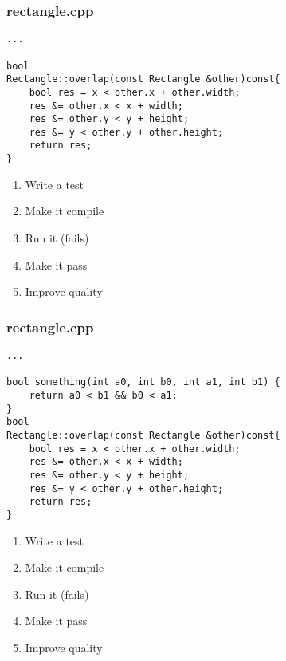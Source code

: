 \begin{frame}[fragile]
\frametitle{rectangle.cpp}
\begin{minipage}[t]{0.48\linewidth}
\begin{lstlisting}
...

bool 
Rectangle::overlap(const Rectangle &other)const{
    bool res = x < other.x + other.width;
    res &= other.x < x + width;
    res &= other.y < y + height;
    res &= y < other.y + other.height;
    return res;
}
\end{lstlisting}
\end{minipage}\hfill
\begin{minipage}[t]{0.28\linewidth}
  \small
  \begin{enumerate} 
    \item \textcolor{deadcolor}{Write a test}
    \item \textcolor{deadcolor}{Make it compile}
    \item \textcolor{deadcolor}{Run it (fails)}
    \item \textcolor{deadcolor}{Make it pass}
    \item \textcolor{activecolor}{Improve quality}
  \end{enumerate} 
\end{minipage}
\end{frame}


\begin{frame}[fragile]
\frametitle{rectangle.cpp}
\begin{minipage}[t]{0.48\linewidth}
\begin{lstlisting}
...

bool something(int a0, int b0, int a1, int b1) {
    return a0 < b1 && b0 < a1;
}
bool 
Rectangle::overlap(const Rectangle &other)const{
    bool res = x < other.x + other.width;
    res &= other.x < x + width;
    res &= other.y < y + height;
    res &= y < other.y + other.height;
    return res;
}
\end{lstlisting}
\end{minipage}\hfill
\begin{minipage}[t]{0.28\linewidth}
  \small
  \begin{enumerate} 
    \item \textcolor{deadcolor}{Write a test}
    \item \textcolor{deadcolor}{Make it compile}
    \item \textcolor{deadcolor}{Run it (fails)}
    \item \textcolor{deadcolor}{Make it pass}
    \item \textcolor{activecolor}{Improve quality}
  \end{enumerate} 
\end{minipage}
\end{frame}


